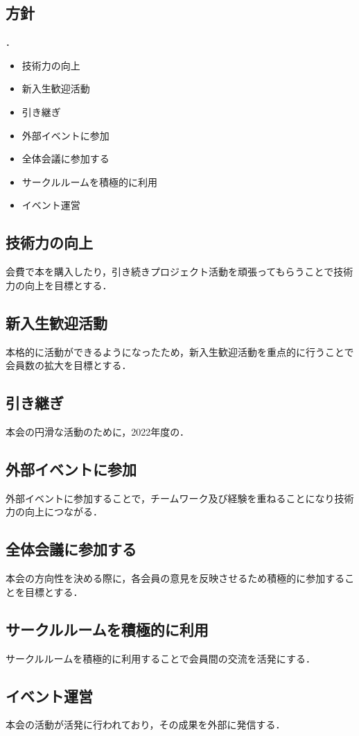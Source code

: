 \subsection*{\newGradeIfKouki{}\secondGrade{}方針}


．

\begin{itemize}
    \item 技術力の向上
    \item 新入生歓迎活動   
    \item 引き継ぎ
    \item 外部イベントに参加
    \item 全体会議に参加する
    \item サークルルームを積極的に利用
    \item イベント運営
\end{itemize}

\subsection*{技術力の向上}
会費で本を購入したり，引き続きプロジェクト活動を頑張ってもらうことで技術力の向上を目標とする．

\subsection*{新入生歓迎活動}
本格的に活動ができるようになったため，新入生歓迎活動を重点的に行うことで会員数の拡大を目標とする．

\subsection*{引き継ぎ}
本会の円滑な活動のために，2022年度の．

\subsection*{外部イベントに参加}
外部イベントに参加することで，チームワーク及び経験を重ねることになり技術力の向上につながる．

\subsection*{全体会議に参加する}
本会の方向性を決める際に，各会員の意見を反映させるため積極的に参加することを目標とする．

\subsection*{サークルルームを積極的に利用}
サークルルームを積極的に利用することで会員間の交流を活発にする．

\subsection*{イベント運営}
本会の活動が活発に行われており，その成果を外部に発信する．

